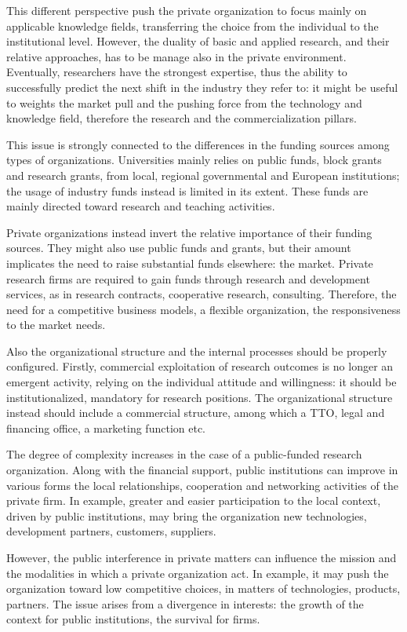 This different perspective push the private organization to focus mainly on applicable knowledge fields, transferring the choice from the individual to the institutional level. However, the duality of basic and applied research, and their relative approaches, has to be manage also in the private environment. Eventually, researchers have the strongest expertise, thus the ability to successfully predict the next shift in the industry they refer to: it might be useful to weights the market pull and the pushing force from the technology and knowledge field, therefore the research and the commercialization pillars. 

This issue is strongly connected to the differences in the funding sources among types of organizations. Universities mainly relies on public funds, block grants and research grants, from local, regional governmental and European institutions; the usage of industry funds instead is limited in its extent. These funds are mainly directed toward research and teaching activities. 

Private organizations instead invert the relative importance of their funding sources. They might also use public funds and grants, but their amount implicates the need to raise substantial funds elsewhere: the market. Private research firms are required to gain funds through research and development services, as in research contracts, cooperative research, consulting. Therefore, the need for a competitive business models, a flexible organization, the responsiveness to the market needs.

Also the organizational structure and the internal processes should be properly configured. Firstly, commercial exploitation of research outcomes is no longer an emergent activity, relying on the individual attitude and willingness: it should be institutionalized, mandatory for research positions. The organizational structure instead should include a commercial structure, among which a TTO, legal and financing office, a marketing function etc.

The degree of complexity increases in the case of a public-funded research organization. Along with the financial support, public institutions can improve in various forms the local relationships, cooperation and networking activities of the private firm. In example, greater and easier participation to the local context, driven by public institutions, may bring the organization new technologies, development partners, customers, suppliers.  

However, the public interference in private matters can influence the mission and the modalities in which a private organization act. In example, it may push the organization toward low competitive choices, in matters of technologies, products, partners. The issue arises from a divergence in interests: the growth of the context for public institutions, the survival for firms.  

